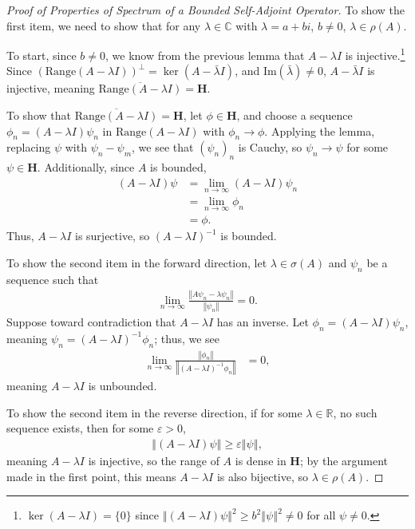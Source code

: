 \documentclass[10pt]{extarticle}
\newcommand{\R}{\mathbb{R}}
\newcommand{\C}{\mathbb{C}}
\newcommand{\norm}[1]{\left\Vert #1\right\Vert}
\theoremstyle{plain}
\theoremstyle{definition}
\theoremstyle{remark}
\renewcommand{\newline}{\hfill\break}
\begin{document}
  \begin{proof}[Proof of Properties of Spectrum of a Bounded Self-Adjoint Operator]
    To show the first item, we need to show that for any $\lambda \in \C$ with $\lambda = a + bi$, $b \neq 0$, $\lambda \in \rho(A)$.\newline

    To start, since $b\neq 0$, we know from the previous lemma that $A - \lambda I$ is injective.\footnote{$\ker(A - \lambda I) = \{0\}$ since $\norm{(A-\lambda I)\psi}^2 \geq b^2\norm{\psi}^2 \neq 0$ for all $\psi \neq 0$.} Since $\left(\text{Range}(A - \lambda I)\right)^{\perp} = \ker(A - \bar{\lambda}I)$, and $\text{Im}(\bar{\lambda}) \neq 0$, $A - \bar{\lambda} I$ is injective, meaning $\overline{\text{Range}(A - \lambda I)} = \mathbf{H}$.\newline

    To show that $\overline{\text{Range}(A - \lambda I)} = \mathbf{H}$, let $\phi \in \mathbf{H}$, and choose a sequence $\phi_n = (A - \lambda I)\psi_n$ in $\text{Range}(A - \lambda I)$ with $\phi_n \rightarrow \phi$. Applying the lemma, replacing $\psi$ with $\psi_n - \psi_m$, we see that $(\psi_n)_n$ is Cauchy, so $\psi_n \rightarrow \psi$ for some $\psi \in \mathbf{H}$. Additionally, since $A$ is bounded,
    \begin{align*}
      (A - \lambda I)\psi &= \lim_{n\rightarrow\infty}(A - \lambda I)\psi_n\\
                          &= \lim_{n\rightarrow\infty}\phi_n\\
                          &= \phi.
    \end{align*}
    Thus, $A - \lambda I$ is surjective, so $(A - \lambda I)^{-1}$ is bounded.\newline

    To show the second item in the forward direction, let $\lambda \in \sigma(A)$ and $\psi_n$ be a sequence such that
    \begin{align*}
      \lim_{n\rightarrow\infty}\frac{\norm{A\psi_n - \lambda \psi_n}}{\norm{\psi_n}} = 0.
    \end{align*}
    Suppose toward contradiction that $A - \lambda I$ has an inverse. Let $\phi_n = (A - \lambda I)\psi_n$, meaning $\psi_n = (A - \lambda I)^{-1}\phi_n$; thus, we see
    \begin{align*}
      \lim_{n\rightarrow\infty}\frac{\norm{\phi_n}}{\norm{(A - \lambda I)^{-1}\phi_n}} &= 0,
    \end{align*}
    meaning $A - \lambda I$ is unbounded.\newline

    To show the second item in the reverse direction, if for some $\lambda \in \R$, no such sequence exists, then for some $\varepsilon > 0$,
    \begin{align*}
      \norm{(A - \lambda I)\psi} \geq \varepsilon \norm{\psi},
    \end{align*}
    meaning $A - \lambda I$ is injective, so the range of $A$ is dense in $\mathbf{H}$; by the argument made in the first point, this means $A - \lambda I$ is also bijective, so $\lambda \in \rho(A)$.
  \end{proof}
\end{document}
